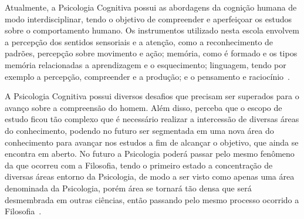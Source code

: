 Atualmente, a Psicologia Cognitiva possui as abordagens da cognição humana de modo interdisciplinar, tendo o objetivo de compreender e aperfeiçoar os estudos sobre o comportamento humano.
Os instrumentos utilizado nesta escola envolvem a percepção dos sentidos sensoriais e a atenção, como a reconhecimento de padrões, percepção sobre movimento e ação; memória, como é formado e os tipos memória relacionadas a aprendizagem e o esquecimento;
linguagem, tendo por exemplo a percepção, compreender e a produção; e o pensamento e raciocínio~\cite{eysenck2017psi_cognitiva,sternberg2000psicologia}.
 
A Psicologia Cognitiva possui diversos desafios que precisam ser superados para o avanço sobre a compreensão do homem.
Além disso, perceba que o escopo de estudo ficou tão complexo que é necessário realizar a intercessão de diversas áreas do conhecimento, podendo no futuro ser segmentada em uma nova área do conhecimento para avançar nos estudos a fim de alcançar o objetivo, que ainda se encontra em aberto.
No futuro a Psicologia poderá passar pelo mesmo fenômeno da que ocorreu com a Filosofia, tendo o primeiro estado a concentração de diversas áreas entorno da Psicologia, de modo a ser visto como apenas uma área denominada da Psicologia, porém área se tornará tão densa que será desmembrada em outras ciências, então passando pelo mesmo processo ocorrido a Filosofia~\cite{marcondes1997filosofia}.

